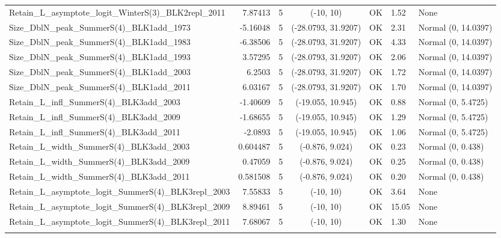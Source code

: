 \documentclass[12pt,]{article}
\begin{document}
\begin{landscape}
\begin{longtable}{lrcccll}
  Retain\_L\_asymptote\_logit\_WinterS(3)\_BLK2repl\_2011 & 7.87413 & 5 & (-10, 10) & OK & 1.52 & None \\ 
  Size\_DblN\_peak\_SummerS(4)\_BLK1add\_1973 & -5.16048 & 5 & (-28.0793, 31.9207) & OK & 2.31 & Normal (0, 14.0397) \\ 
  Size\_DblN\_peak\_SummerS(4)\_BLK1add\_1983 & -6.38506 & 5 & (-28.0793, 31.9207) & OK & 4.33 & Normal (0, 14.0397) \\ 
  Size\_DblN\_peak\_SummerS(4)\_BLK1add\_1993 & 3.57295 & 5 & (-28.0793, 31.9207) & OK & 2.06 & Normal (0, 14.0397) \\ 
  Size\_DblN\_peak\_SummerS(4)\_BLK1add\_2003 & 6.2503 & 5 & (-28.0793, 31.9207) & OK & 1.72 & Normal (0, 14.0397) \\ 
  Size\_DblN\_peak\_SummerS(4)\_BLK1add\_2011 & 6.03167 & 5 & (-28.0793, 31.9207) & OK & 1.70 & Normal (0, 14.0397) \\ 
  Retain\_L\_infl\_SummerS(4)\_BLK3add\_2003 & -1.40609 & 5 & (-19.055, 10.945) & OK & 0.88 & Normal (0, 5.4725) \\ 
  Retain\_L\_infl\_SummerS(4)\_BLK3add\_2009 & -1.68655 & 5 & (-19.055, 10.945) & OK & 1.29 & Normal (0, 5.4725) \\ 
  Retain\_L\_infl\_SummerS(4)\_BLK3add\_2011 & -2.0893 & 5 & (-19.055, 10.945) & OK & 1.06 & Normal (0, 5.4725) \\ 
  Retain\_L\_width\_SummerS(4)\_BLK3add\_2003 & 0.604487 & 5 & (-0.876, 9.024) & OK & 0.23 & Normal (0, 0.438) \\ 
  Retain\_L\_width\_SummerS(4)\_BLK3add\_2009 & 0.47059 & 5 & (-0.876, 9.024) & OK & 0.25 & Normal (0, 0.438) \\ 
  Retain\_L\_width\_SummerS(4)\_BLK3add\_2011 & 0.581508 & 5 & (-0.876, 9.024) & OK & 0.20 & Normal (0, 0.438) \\ 
  Retain\_L\_asymptote\_logit\_SummerS(4)\_BLK3repl\_2003 & 7.55833 & 5 & (-10, 10) & OK & 3.64 & None \\ 
  Retain\_L\_asymptote\_logit\_SummerS(4)\_BLK3repl\_2009 & 8.89461 & 5 & (-10, 10) & OK & 15.05 & None \\ 
  Retain\_L\_asymptote\_logit\_SummerS(4)\_BLK3repl\_2011 & 7.68067 & 5 & (-10, 10) & OK & 1.30 & None \\ 
   \hline
\hline
\label{tab:model_params}
\end{longtable}
\endgroup
\end{landscape}

\newpage

\FloatBarrier
\end{document}
